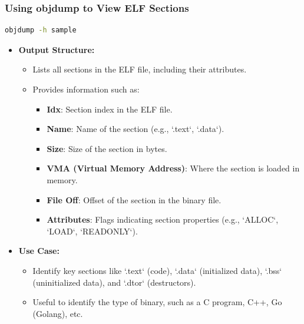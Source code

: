 \begin{frame}[fragile]
\frametitle{Using objdump to View ELF Sections}

\begin{lstlisting}[language=bash, basicstyle=\ttfamily, frame=single, breaklines=true]
objdump -h sample
\end{lstlisting}

\begin{itemize}
    \item \textbf{Output Structure:}
    \begin{itemize}
        \item Lists all sections in the ELF file, including their attributes.
        \item Provides information such as:
        \begin{itemize}
            \item \textbf{Idx}: Section index in the ELF file.
            \item \textbf{Name}: Name of the section (e.g., `.text`, `.data`).
            \item \textbf{Size}: Size of the section in bytes.
            \item \textbf{VMA (Virtual Memory Address)}: Where the section is loaded in memory.
            \item \textbf{File Off}: Offset of the section in the binary file.
            \item \textbf{Attributes}: Flags indicating section properties (e.g., `ALLOC`, `LOAD`, `READONLY`).
        \end{itemize}
    \end{itemize}
    \item \textbf{Use Case:}
    \begin{itemize}
        \item Identify key sections like `.text` (code), `.data` (initialized data), `.bss` (uninitialized data), and `.dtor` (destructors).
        \item Useful to identify the type of binary, such as a C program, C++, Go (Golang), etc. 
    \end{itemize}
\end{itemize}

\end{frame}



